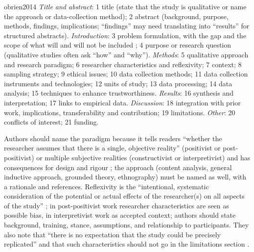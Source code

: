\begin{papercard}{obrien2014}
 \emph{Title and abstract}: 1 title (state that the study is qualitative or name the approach or data-collection method); 2 abstract (background, purpose, methods, findings, implications; ``findings'' may need translating into ``results'' for structured abstracts). \emph{Introduction}: 3 problem formulation, with the gap and the scope of what will and will not be included ; 4 purpose or research question (qualitative studies often ask ``how'' and ``why''). \emph{Methods}: 5 qualitative approach and research paradigm; 6 researcher characteristics and reflexivity; 7 context; 8 sampling strategy; 9 ethical issues; 10 data collection methods; 11 data collection instruments and technologies; 12 units of study; 13 data processing; 14 data analysis; 15 techniques to enhance trustworthiness. \emph{Results}: 16 synthesis and interpretation; 17 links to empirical data. \emph{Discussion}: 18 integration with prior work, implications, transferability and contribution; 19 limitations. \emph{Other}: 20 conflicts of interest; 21 funding.

 Authors should name the paradigm because it tells readers ``whether the researcher assumes that there is a single, objective reality'' (positivist or post-positivist) or multiple subjective realities (constructivist or interpretivist) and has consequences for design and rigour ; the approach (content analysis, general inductive approach, grounded theory, ethnography) must be named as well, with a rationale and references. Reflexivity is the ``intentional, systematic consideration of the potential or actual effects of the researcher(s) on all aspects of the study'' ; in post-positivist work researcher characteristics are seen as possible bias, in interpretivist work as accepted context; authors should state background, training, stance, assumptions, and relationship to participants. They also note that ``there is no expectation that the study could be precisely replicated'' and that such characteristics should not go in the limitations section .


\end{papercard}
